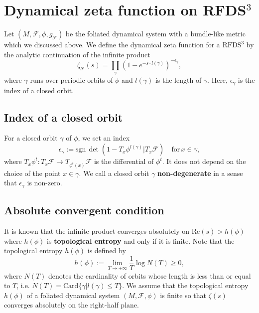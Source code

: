 \section{Dynamical zeta function on RFDS\texorpdfstring{$^{3}$}{3}}

Let $(M,\mathcal{F},\phi,g_{\mathcal{F}})$ be the foliated dynamical system with a bundle-like metric which we discussed above.
We define the dynamical zeta function for a $\mathrm{RFDS}^{3}$ by the analytic continuation of the infinite product
\begin{equation*}
  \zeta_{\mathcal{F}}(s)=\prod_{\gamma}(1-e^{-s\cdot l(\gamma)})^{-\epsilon_{\gamma}},
\end{equation*}
where $\gamma$ runs over periodic orbits of $\phi$ and  $l(\gamma)$ is the length of $\gamma$. 
Here, $\epsilon_{\gamma}$ is the index of a closed orbit.


    \subsection{Index of a closed orbit}
    For a closed orbit $\gamma$ of $\phi$, we set an index
    \begin{equation*}
        \epsilon_{\gamma}:=\mathrm{sgn}\,\det(1-T_{x}\phi^{l(\gamma)}|T_{x}\mathcal{F})\quad\mathrm{for}\,{x}\in\gamma,
    \end{equation*}
    where $T_{x}\phi^{t}:T_{x}\mathcal{F}\rightarrow{T_{\phi^{t}(x)}\mathcal{F}}$ is the differential of $\phi^{t}$.
    It does not depend on the choice of the point $x\in\gamma$.
    We call a closed orbit $\gamma$ \textbf{non-degenerate} in a sense that $\epsilon_{\gamma}$ is non-zero.
    
    
    \subsection{Absolute convergent condition}
    It is known that the infinite product converges absolutely on $\mathrm{Re}(s)>h(\phi)$ where $h(\phi)$ is \textbf{topological entropy} and only if it is finite. 
    Note that  the topological entropy $h(\phi)$ is defined by
    \begin{equation*}
        h(\phi):=\lim_{T\rightarrow+\infty}\frac{1}{T}\log{N(T)}\ge0,
    \end{equation*}
    where  $N(T)$ denotes the cardinality of orbits whose length is less than or equal to $T$, i.e. $N(T)=\mathrm{Card}\{\gamma|l(\gamma)\le{T}\}$. 
    We assume that the topological entropy $h(\phi)$ of a foliated dynamical system  $(M,\mathcal{F},\phi)$ is finite so that $\zeta(s)$ converges absolutely on the right-half plane.
    